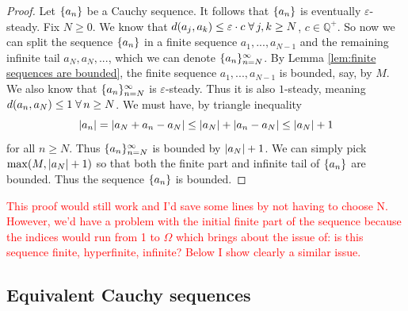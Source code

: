 { \label{lem:Cauchy sequences are bounded}
\begin{proof}
    Let $\{a_n\}$ be a Cauchy sequence. It follows that $\{a_n\}$ is eventually $\varepsilon$-steady. Fix $N \geq 0$. We know that $d(a_j, a_k)\leq \varepsilon \cdot c \;\forall\, j,k \geq N$, $c \in \mathbb{Q}^{+}$. So now we can split the sequence $\{a_n\}$ in a finite sequence $a_1, ..., a_{N-1}$ and the remaining infinite tail $a_N, a_{N}, ...$, which we can denote $\{a_n\}_{n=N}^\infty$. By Lemma \ref{lem:finite sequences are bounded}, the finite sequence $a_1, ..., a_{N-1}$ is bounded, say, by $M$. We also know that $\{a_n\}_{n=N}^\infty$ is $\varepsilon$-steady. Thus it is also $1$-steady, meaning $d(a_n, a_N) \leq 1 \;\forall\, n \geq N$. We must have, by triangle inequality
    \begin{equation*}
        \left\lvert a_n \right\rvert = \left\lvert a_N+a_n-a_N \right\rvert \leq \left\lvert a_N \right\rvert + \left\lvert a_n-a_N \right\rvert \leq \left\lvert a_N \right\rvert +1
    \end{equation*}
    for all $n \geq N$. Thus $\{a_n\}_{n=N}^\infty$ is bounded by $\left\lvert a_N \right\rvert +1$. We can simply pick $\max(M, \left\lvert a_N \right\rvert +1)$ so that both the finite part and infinite tail of $\{a_n\}$ are bounded. Thus the sequence $\{a_n\}$ is bounded. 
\end{proof}
\textcolor{red}{This proof would still work and I'd save some lines by not having to choose N. However, we'd have a problem with the initial finite part of the sequence because the indices would run from 1 to $\Omega$ which brings about the issue of: is this sequence finite, hyperfinite, infinite? Below I show clearly a similar issue.}

\subsection{Equivalent Cauchy sequences}

}
